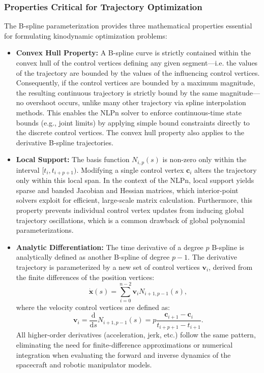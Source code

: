 \subsubsection{Properties Critical for Trajectory Optimization}
The B-spline parameterization provides three mathematical properties essential for formulating kinodynamic optimization problems:
\begin{itemize}
\item \textbf{Convex Hull Property:} A B-spline curve is strictly contained within the convex hull of the control vertices defining any given segment---i.e. the values of the trajectory are bounded by the values of the influencing control vertices. 
Consequently, if the control vertices are bounded by a maximum magnitude, the resulting continuous trajectory is strictly bound by the same magnitude---no overshoot occurs, unlike many other trajectory via spline interpolation methods. 
This enables the \ac{NLPn} solver to enforce continuous-time state bounds (e.g., joint limits) by applying simple bound constraints directly to the discrete control vertices.
The convex hull property also applies to the derivative B-spline trajectories.
\item \textbf{Local Support:} 
The basis function $N_{i,p}(s)$ is non-zero only within the interval $[t_i, t_{i+p+1})$. 
Modifying a single control vertex $\mathbf{c}_i$ alters the trajectory only within this local span. 
In the context of the \ac{NLPn}, local support yields sparse and banded Jacobian and Hessian matrices, which interior-point solvers exploit for efficient, large-scale matrix calculation.
Furthermore, this property prevents individual control vertex updates from inducing global trajectory oscillations, which is a common drawback of global polynomial parameterizations.
\item \textbf{Analytic Differentiation:} 
The time derivative of a degree $p$ B-spline is analytically defined as another B-spline of degree $p-1$. 
The derivative trajectory is parameterized by a new set of control vertices $\mathbf{v}_i$, derived from the finite differences of the position vertices:
\begin{equation}
    \dot{\mathbf{x}}(s) = \sum_{i=0}^{n-2} \mathbf{v}_i N_{i+1, p-1}(s),
\label{eq:bspline_derivative}
\end{equation}
where the velocity control vertices are defined as:
\begin{equation}
    \mathbf{v}_i = 
    \frac{\mathrm{d}}{\mathrm{d}s} N_{i+1, p-1}(s) =
    p \frac{\mathbf{c}_{i+1} - \mathbf{c}_i}{t_{i+p+1} - t_{i+1}}.
\label{eq:bspline_velocity_vertex}
\end{equation}
All higher-order derivatives (acceleration, jerk, etc.) follow the same pattern, eliminating the need for finite-difference approximations or numerical integration when evaluating the forward and inverse dynamics of the spacecraft and robotic manipulator models.
\end{itemize}

